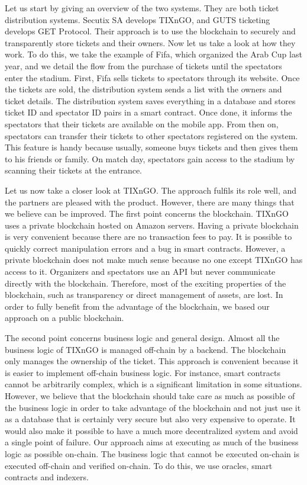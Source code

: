 \documentclass[a4paper,11pt,oneside]{report}
\begin{document}
Let us start by giving an overview of the two systems. They are both ticket distribution systems. Secutix SA develops TIXnGO, and GUTS ticketing develops GET Protocol. Their approach is to use the blockchain to securely and transparently store tickets and their owners. Now let us take a look at how they work. To do this, we take the example of Fifa, which organized the Arab Cup last year, and we detail the flow from the purchase of tickets until the spectators enter the stadium. First, Fifa sells tickets to spectators through its website. Once the tickets are sold, the distribution system sends a list with the owners and ticket details. The distribution system saves everything in a database and stores ticket ID and spectator ID pairs in a smart contract. Once done, it informs the spectators that their tickets are available on the mobile app. From then on, spectators can transfer their tickets to other spectators registered on the system. This feature is handy because usually, someone buys tickets and then gives them to his friends or family. On match day, spectators gain access to the stadium by scanning their tickets at the entrance.

Let us now take a closer look at TIXnGO. The approach fulfils its role well, and the partners are pleased with the product. However, there are many things that we believe can be improved. The first point concerns the blockchain. TIXnGO uses a private blockchain hosted on Amazon servers. Having a private blockchain is very convenient because there are no transaction fees to pay. It is possible to quickly correct manipulation errors and a bug in smart contracts. However, a private blockchain does not make much sense because no one except TIXnGO has access to it. Organizers and spectators use an API but never communicate directly with the blockchain. Therefore, most of the exciting properties of the blockchain, such as transparency or direct management of assets, are lost. In order to fully benefit from the advantage of the blockchain, we based our approach on a public blockchain.

The second point concerns business logic and general design. Almost all the business logic of TIXnGO is managed off-chain by a backend. The blockchain only manages the ownership of the ticket. This approach is convenient because it is easier to implement off-chain business logic. For instance, smart contracts cannot be arbitrarily complex, which is a significant limitation in some situations. However, we believe that the blockchain should take care as much as possible of the business logic in order to take advantage of the blockchain and not just use it as a database that is certainly very secure but also very expensive to operate. It would also make it possible to have a much more decentralized system and avoid a single point of failure. Our approach aims at executing as much of the business logic as possible on-chain. The business logic that cannot be executed on-chain is executed off-chain and verified on-chain. To do this, we use oracles, smart contracts and indexers.
\end{document}
